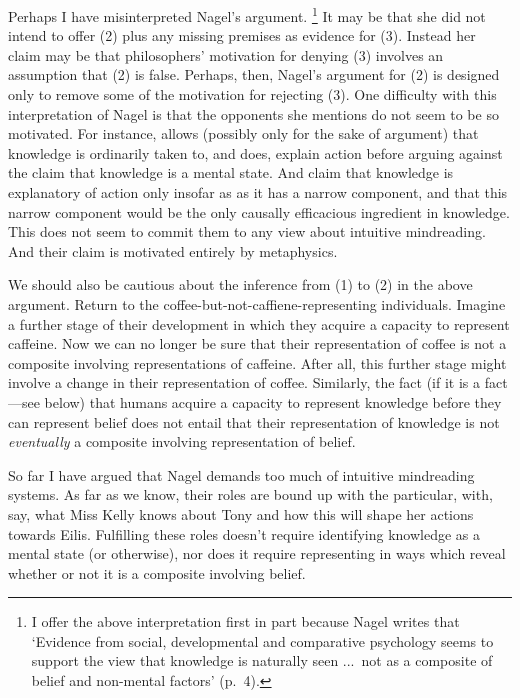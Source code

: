 \documentclass[11pt,a4paper]{extarticle}
\begin{document}
Perhaps I have misinterpreted Nagel's argument.%
\footnote{
I offer the above interpretation first in part because
Nagel writes that
`Evidence from social, developmental and comparative psychology seems to support the view that knowledge is naturally seen  ...\ not as a composite of belief and non-mental factors' (p.\ 4).
}
It may be that she did not intend to offer (2) plus any missing premises as evidence for  (3).
Instead her claim may be that
philosophers' motivation for denying (3)
involves an assumption that (2) is false.
Perhaps, then, Nagel's argument for (2) is  designed only to remove some of the motivation for rejecting (3).
One difficulty with this interpretation of Nagel is that the opponents she mentions do not seem to be so motivated.
For instance, 
 \citet[p.\ 35]{fricker_2009} allows (possibly only for the sake of argument) that knowledge  is ordinarily taken to, and does, explain action 
before arguing against
 the claim that knowledge is a mental state.
And \citet[pp.\ 39-40]{magnus_williamson_2003}
claim that knowledge is explanatory of action only insofar as as it has a narrow component,
and that this narrow component would be the only causally efficacious ingredient in knowledge.
This does not seem to commit them to any view about intuitive mindreading. 
And their claim is motivated entirely by metaphysics.


We should also be cautious about the inference from (1) to (2) in the above argument.
Return to the coffee-but-not-caffiene-representing individuals.
Imagine a further stage of their development in which they acquire a capacity to represent caffeine.
Now we can no longer be sure that their representation of coffee is not a composite involving representations of caffeine.
After all, this further stage might involve a change in their representation of coffee.
Similarly, the fact (if it is a fact---see below) that humans acquire a capacity to represent knowledge before they can represent belief does not entail that their representation of knowledge is not \emph{eventually} a composite involving representation of belief.

So far I have argued that Nagel demands too much of intuitive mindreading systems.
As far as we know, their roles are bound up with the particular, with, say, what Miss Kelly knows about Tony and how this will shape her actions towards Eilis.
Fulfilling these roles doesn't require identifying knowledge as a mental state (or otherwise),
nor does it require representing in ways which reveal whether or not it is a composite involving belief.
\end{document}
